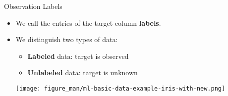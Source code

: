 \documentclass[11pt,compress,t,notes=noshow, xcolor=table]{beamer}
\begin{document}
\begin{vbframe}{Observation Labels}

\begin{itemize}

  \item We call the entries of the target column \textbf{labels}.
  \item We distinguish two types of data:
  
  \begin{itemize}
  
      \item \textbf{Labeled} data: target is observed
    
    \item \textbf{Unlabeled} data:  target is unknown
  
  \end{itemize}
  
  
  
  \begin{center}
    \texttt{[image: figure\_man/ml-basic-data-example-iris-with-new.png]} 
  \end{center}

\end{itemize}

\end{vbframe}

\end{document}
